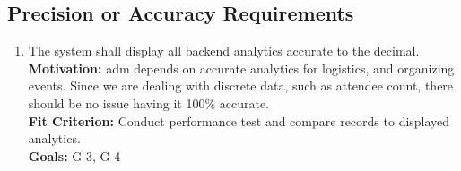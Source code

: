 \documentclass[12pt]{article}
\begin{document}
\subsection{Precision or Accuracy Requirements}
\begin{enumerate}[label=\bfseries PA-\arabic*:, wide=0pt, leftmargin=*, ref=\bfseries PA-\arabic*]
  \item \label{PA1} The system shall display all backend analytics accurate to the decimal.\\
  {\bf Motivation:} \Gls{adm} depends on accurate analytics for logistics, and organizing events. Since we are dealing with discrete data, such as attendee count, there should be no issue having it 100\% accurate.\\
  {\bf Fit Criterion:} Conduct performance test and compare records to displayed analytics.\\
  {\bf Goals:} G-3, G-4
\end{enumerate}
\end{document}
